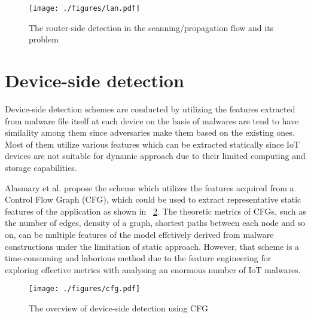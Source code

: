 \begin{figure}[p]
 \centering
 \hspace{-55pt}
 \texttt{[image: ./figures/lan.pdf]}
 \caption{The router-side detection in the scanning/propagation flow and its problem} 
 \label{fig:lan}
\end{figure}
\afterpage{\clearpage}
\newpage

\section{Device-side detection} 
Device-side detection schemes are conducted by utilizing the features extracted from malware file itself at each device on the basis of malwares are tend to have similality among them since adversaries make them based on the existing ones.
Most of them utilize various features which can be extracted statically since IoT devices are not suitable for dynamic approach due to their limited computing and storage capabilities.

Alasmary et al. \cite{cfg} propose the scheme which utilizes the features acquired from a Control Flow Graph (CFG), which could be used to extract representative static features of the application as shown in \figurename~\ref{fig:cfg}.
The theoretic metrics of CFGs, such as the number of edges, density of a graph, shortest paths between each node and so on, can be multiple features of the model effctively derived from malware constructions under the limitation of static approach.
However, that scheme is a time-consuming and laborious method due to the feature engineering for exploring effective metrics with analysing an enormous number of IoT malwares.

\begin{figure}[p]
 \centering
 \hspace{-55pt}
 \texttt{[image: ./figures/cfg.pdf]}
 \caption{The overview of device-side detection using CFG} 
 \label{fig:cfg}
\end{figure}
\afterpage{\clearpage}
\newpage
\newpage

